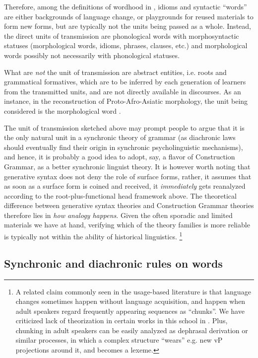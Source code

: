 \documentclass[a4paper, oneside, scheme=plain, 12pt]{article}
\newcommand*{\citepage}[1]{p.~{#1}}
\begin{document}
Therefore, among the definitions of wordhood in ,
idioms and syntactic ``words'' are either backgrounds of language change,
or playgrounds for reused materials to form new forms,
but are typically not the units being passed as a whole.
Instead, the direct units of transmission are phonological words with morphosyntactic statuses
(morphological words, idioms, phrases, clauses, etc.)
and morphological words possibly not necessarily with phonological statuses.

What are \emph{not} the unit of transmission are abstract entities, i.e. roots and grammatical formatives,
which are to be inferred by each generation of learners from the transmitted units,
and are not directly available in discourses.
As an instance, in the reconstruction of Proto-Afro-Asiatic morphology,
the unit being considered is the morphological word \citep[\citepage{21}]{wilson2020concatenative}.

The unit of transmission sketched above may prompt people to argue that it is the only natural unit in a synchronic theory of grammar
(as diachronic laws should eventually find their origin in synchronic psycholinguistic mechanisms),
and hence, it is probably a good idea to adopt, say, a flavor of Construction Grammar, as a better synchronic linguist theory.
It is however worth noting that generative syntax does not deny the role of surface forms,
rather, it assumes that as soon as a surface form is coined and received,
it \emph{immediately} gets reanalyzed according to the root-plus-functional head framework above.
The theoretical difference between generative syntax theories and Construction Grammar theories
therefore lies in \emph{how analogy happens}.
Given the often sporadic and limited materials we have at hand,
verifying which of the theory families is more reliable is typically not within the ability of historical linguistics.%
\footnote{
    A related claim commonly seen in the usage-based literature is that 
    language changes sometimes happen without language acquisition,
    and happen when adult speakers regard frequently appearing sequences as ``chunks''.
    We have criticized lack of theorization in certain works in this school in .
    Plus, chunking in adult speakers can be easily analyzed as dephrasal derivation or similar processes,
    in which a complex structure ``wears'' e.g. new vP projections around it,
    and becomes a lexeme. 
}

\subsection{Synchronic and diachronic rules on words}
\end{document}
